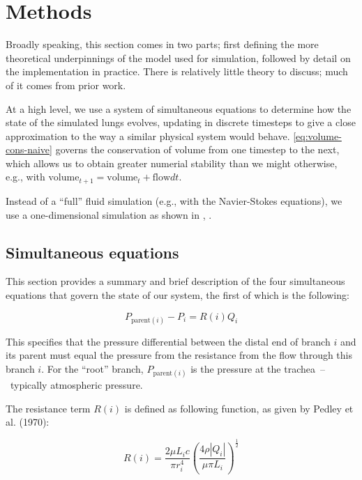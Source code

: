 %
\section{Methods}

Broadly speaking, this section comes in two parts; first defining the more theoretical underpinnings
of the model used for simulation, followed by detail on the implementation in practice. There is
relatively little theory to discuss; much of it comes from prior work.\cite{Foy2018}

At a high level, we use a system of simultaneous equations to determine how the state of the
simulated lungs evolves, updating in discrete timesteps to give a close approximation to the way a
similar physical system would behave. \autoref{eq:volume-cons-naive} governs the
conservation of volume from one timestep to the next, which allows us to obtain greater numerial
stability than we might otherwise, e.g., with
$\text{volume}_{t+1} = \text{volume}_t + \text{flow} dt$.

Instead of a ``full'' fluid simulation (e.g., with the Navier-Stokes equations), we use a
one-dimensional simulation as shown in \citeauthor{Foy2018}, \citeyear{Foy2018}.

\subsection{Simultaneous equations}

This section provides a summary and brief description of the four simultaneous equations that govern
the state of our system, the first of which is the following:

\begin{equation}
    P_{\text{parent}(i)} - P_i = R(i) Q_i
\end{equation}

\noindent
This specifies that the pressure differential between the distal end of branch $i$ and its parent
must equal the pressure from the resistance from the flow through this branch $i$. For the ``root''
branch, $P_{\text{parent}(i)}$ is the pressure at the trachea~--~typically atmospheric pressure.

The resistance term $R(i)$ is defined as following function, as given by Pedley et al. (1970):

\begin{equation*}
    R(i) = \frac{2 \mu L_i c}{\pi r_i^4} \left( \frac{4 \rho |Q_i|}{\mu \pi L_i} \right)^{\frac{1}{2}}
\end{equation*}


